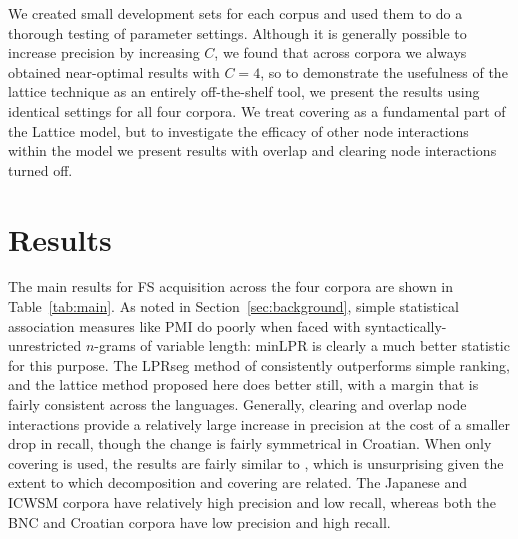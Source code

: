 \documentclass[11pt,letterpaper]{article}
\newcommand{\tabref}[2][]{Table#1~\ref{#2}\xspace}
\newcommand{\secref}[2][]{Section#1~\ref{#2}\xspace}
\begin{document}


We created small development sets for each corpus and used them to do a thorough testing of parameter settings. Although it is generally possible to increase precision by increasing $C$, we found that across corpora we always obtained near-optimal results with $C=4$, so to demonstrate the usefulness of the lattice technique as an entirely off-the-shelf tool, we present the results using identical settings for all four corpora. We treat covering as a fundamental part of the Lattice model, but to investigate the efficacy of other node interactions within the model we present results with overlap and clearing node interactions turned off.
		

\section{Results}

The main results for FS acquisition across the four corpora are shown in \tabref{tab:main}. As noted in \secref{sec:background}, simple statistical association measures like PMI do poorly when faced with syntactically-unrestricted $n$-grams of variable length: minLPR is clearly a much better statistic for this purpose. The LPRseg method of  consistently outperforms simple ranking, and the lattice method proposed here does better still, with a margin that is fairly consistent across the languages. Generally, clearing and overlap node interactions provide a relatively large increase in precision at the cost of a smaller drop in recall, though the change is fairly symmetrical in Croatian.  When only covering is used, the results are fairly similar to , which is unsurprising given the extent to which decomposition and covering are related. The Japanese and ICWSM corpora have relatively high precision and low recall, whereas both the BNC and Croatian corpora have low precision and high recall.
\end{document}
